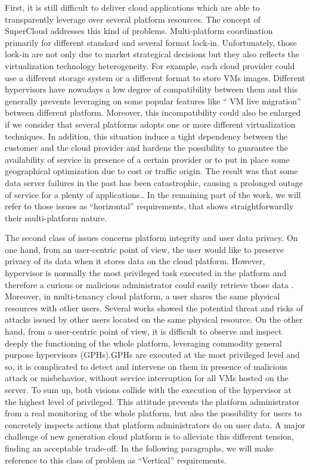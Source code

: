 \documentclass{sig-alternate}
\begin{document}
First, it is still difficult to deliver cloud applications which are able to transparently leverage over several platform resources. The concept of SuperCloud \cite{art:blan, xclo:blank} addresses this kind of problems. Multi-platform coordination primarily for different standard and several format lock-in. Unfortunately, those lock-in are not only due to market strategical decisions but they also reflects the virtualization technology heterogeneity. For example, each cloud provider could use a different storage system or a different format to store VMs images. Different hypervisors have nowadays a low degree of compatibility between them and this generally prevents leveraging on some popular features like `` VM live migration'' between different platform. Moreover, this incompatibility could also be enlarged if we consider that several platforms adopts one or more different virtualization techniques. In addition, this situation induce a tight dependency between the customer and the cloud provider and hardens the possibility to guarantee the availability of service in presence of a certain provider or to put in place some geographical optimization due to cost or traffic origin. The result was that some data server failures in the past has been catastrophic, causing a prolonged outage of service for a plenty of applications.. In the remaining part of the work, we will refer to those issues as ``horizontal'' requirements, that shows straightforwardly their multi-platform nature.

The second class of issues concerns platform integrity and user data privacy. On one hand, from an user-centric point of view, the user would like to preserve privacy of its data when it stores data on the cloud platform. However, hypervisor is normally the most privileged task executed in the platform and therefore a curious or malicious administrator could easily retrieve those data \cite{cloudvisor:zhang}. Moreover, in multi-tenancy cloud platform, a user shares the same physical resources with other users. Several works \cite{sec:you, bot:att} showed the potential threat and risks of attacks issued by other users located on the same physical resource.
On the other hand, from a user-centric point of view, it is difficult to observe and inspect deeply the functioning of the whole platform, leveraging commodity general purpose hypervisors (GPHs).GPHs are executed at the most privileged level and so, it is complicated to detect and intervene on them in presence of malicious attack or misbehavior, without service interruption for all VMs hosted on the server. 
To sum up, both visions collide with the execution of the hypervisor at the highest level of privileged. This attitude prevents the platform administrator from a real monitoring of the whole platform, but also the possibility for users to concretely inspects actions that platform administrators do on user data. A major challenge of new generation cloud platform is to alleviate this different tension, finding an acceptable trade-off. In the following paragraphs, we will make reference to this class of problem as ``Vertical'' requirements.
\end{document}
